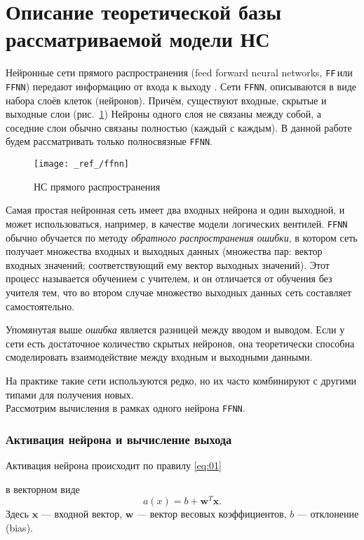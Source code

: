\documentclass[12pt,a4paper]{article}
\newcommand*{\SavedEqref}{}
\let\SavedEqref\eqref
\renewcommand*{\eqref}[1]{%
	\begingroup
	\hypersetup{
		linkcolor=linkequation,
		linkbordercolor=linkequation,
	}%
	\SavedEqref{#1}%
	\endgroup
}
\newcommand{\ffnn}{\texttt{FFNN}}
\newcommand{\ff}{\texttt{FF}}
\renewcommand{\v}{\mathbf}
\begin{document}
\section{Описание теоретической базы рассматриваемой \newline модели НС}
Нейронные сети прямого распространения (feed forward neural networks, 
\ff\,или \ffnn) передают информацию от входа к выходу \cite{Rosenblatt1958}. 
Сети \ffnn, описываются в виде набора слоёв клеток (нейронов). Причём, существуют входные, скрытые и выходные слои
(рис. \,\ref{fig:01})
Нейроны одного слоя не связаны между собой, а соседние слои обычно 
связаны полностью (каждый с каждым). В данной работе будем рассматривать только полносвязные \ffnn.

\begin{figure}[tbh!]
	\centering
	\texttt{[image: \_ref\_/ffnn]}
	\caption{НС прямого распространения\label{fig:01} \cite{NNzoo}}
\end{figure}

Самая простая нейронная сеть имеет два входных нейрона и один выходной, и может использоваться, например, в качестве модели 
логических вентилей. \ffnn\, обычно обучается по методу \emph{обратного распространения ошибки}, в котором сеть получает множества входных и выходных данных (множества пар: {вектор входных значений; соответствующий ему вектор выходных значений}). Этот процесс называется обучением с учителем, и он отличается от обучения без учителя тем, что во втором случае множество выходных данных сеть составляет самостоятельно. 

Упомянутая выше \emph{ошибка} является разницей между вводом и выводом. Если у сети есть достаточное количество скрытых нейронов, она теоретически способна смоделировать взаимодействие между входным и выходными данными. 

На практике такие сети используются редко, но их часто комбинируют с другими типами для получения новых.\\[12pt]
\noindent
Рассмотрим вычисления в рамках одного нейрона \ffnn.

\subsubsection*{Активация нейрона и вычисление выхода}
Активация нейрона происходит по правилу \eqref{eq:01}
в векторном виде 
\begin{equation}\label{eq:01}
a(x) = b + \v{w}^T\v{x}.
\end{equation}
Здесь $\v{x}$ --- входной вектор,
$\v{w}$ --- вектор весовых коэффициентов, $b$ --- отклонение (bias).
\end{document}
